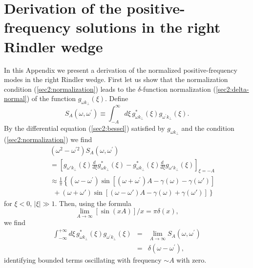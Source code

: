 \documentclass[12pt,nofootinbib,floatfix,aps,prd,showpacs,amsmath,amssymb,eqsecnum]{revtex4-2}
\begin{document}
\section{Derivation of the positive-frequency solutions in the right
Rindler wedge}
\label{Appendix A}

In this Appendix we present a derivation of the normalized
positive-frequency modes in the right Rindler wedge.  First let us show
that the normalization condition (\ref{sec2:normalization}) leads to
the $\delta$-function normalization (\ref{sec2:delta-normal}) of the
function $g_{\omega k_\perp}(\xi)$.
Define
\begin{equation}
S_A(\omega,\omega^\prime) 
\equiv 
\int_{-A}^\infty d\xi\, 
g_{\omega k_\perp}^\ast (\xi) g_{\omega^\prime k_\perp}(\xi).
\end{equation}
 By the differential equation (\ref{sec2:bessel}) satisfied by
$g_{\omega k_\perp}$ and the condition (\ref{sec2:normalization}) 
we find
\begin{eqnarray}
&& (\omega^2 - \omega^{\prime 2}) S_A(\omega,\omega^\prime)\nonumber \\
&& = \left[g_{\omega' k_\perp}(\xi)\frac{d\ }{d\xi}g_{\omega
k_\perp}^\ast(\xi)
- g_{\omega k_\perp}^\ast (\xi)\frac{d\ }{d\xi}g_{\omega' k_\perp}(\xi)
\right]_{\xi=-A} \nonumber \\
&&  \approx \frac{1}{\pi}
\left\{(\omega-\omega^\prime)
\sin\left[(\omega+\omega^\prime)A-\gamma(\omega)-\gamma(\omega')
\right]\right.\nonumber \\
&& \left.\ \  
+(\omega+\omega')\sin\left[(\omega-\omega')A
-\gamma(\omega)+\gamma(\omega')\right]\right\}
\end{eqnarray}
for $\xi <0, \, |\xi| \gg1$.
Then, using the formula
\begin{equation}
\lim_{A\to \infty} [\sin (xA)] / x = \pi \delta(x),
\end{equation}
we find
\begin{eqnarray}
\int_{-\infty}^{+\infty}d\xi\,
g_{\omega k_\perp}^\ast(\xi)
g_{\omega^\prime k_\perp}(\xi)
& = & \lim_{A\to\infty}S_A(\omega,\omega^\prime) \nonumber \\
& = & \delta(\omega-\omega^\prime),
\end{eqnarray}
identifying bounded terms oscillating with frequency $\sim A$ with zero.
\end{document}
